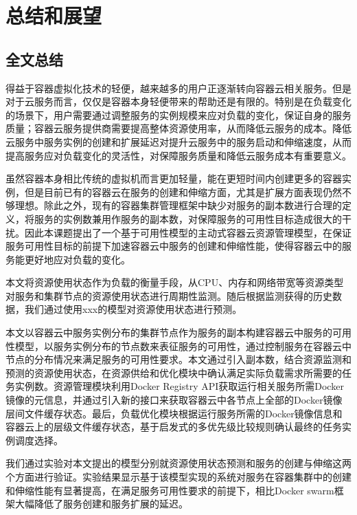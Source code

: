 \chapter{总结和展望}\label{chap:summary}
\section{全文总结}
得益于容器虚拟化技术的轻便，越来越多的用户正逐渐转向容器云相关服务。但是对于云服务而言，仅仅是容器本身轻便带来的帮助还是有限的。特别是在负载变化的场景下，用户需要通过调整服务的实例规模来应对负载的变化，保证自身的服务质量；容器云服务提供商需要提高整体资源使用率，从而降低云服务的成本。降低云服务中服务实例的创建和扩展延迟对提升云服务中的服务启动和伸缩速度，从而提高服务应对负载变化的灵活性，对保障服务质量和降低云服务成本有重要意义。

虽然容器本身相比传统的虚拟机而言更加轻量，能在更短时间内创建更多的容器实例，但是目前已有的容器云在服务的创建和伸缩方面，尤其是扩展方面表现仍然不够理想。除此之外，现有的容器集群管理框架中缺少对服务的副本数进行合理的定义，将服务的实例数兼用作服务的副本数，对保障服务的可用性目标造成很大的干扰。因此本课题提出了一个基于可用性模型的主动式容器云资源管理模型，在保证服务可用性目标的前提下加速容器云中服务的创建和伸缩性能，使得容器云中的服务能更好地应对负载的变化。

本文将资源使用状态作为负载的衡量手段，从CPU、内存和网络带宽等资源类型对服务和集群节点的资源使用状态进行周期性监测。随后根据监测获得的历史数据，我们通过使用xxx的模型对资源使用状态进行预测。

本文以容器云中服务实例分布的集群节点作为服务的副本构建容器云中服务的可用性模型，以服务实例分布的节点数来表征服务的可用性，通过控制服务在容器云中节点的分布情况来满足服务的可用性要求。本文通过引入副本数，结合资源监测和预测的资源使用状态，在资源供给和优化模块中确认满足实际负载需求所需要的任务实例数。资源管理模块利用Docker Registry API获取运行相关服务所需Docker镜像的元信息，并通过引入新的接口来获取容器云中各节点上全部的Docker镜像层间文件缓存状态。最后，负载优化模块根据运行服务所需的Docker镜像信息和容器云上的层级文件缓存状态，基于启发式的多优先级比较规则确认最终的任务实例调度选择。

我们通过实验对本文提出的模型分别就资源使用状态预测和服务的创建与伸缩这两个方面进行验证。实验结果显示基于该模型实现的系统对服务在容器集群中的创建和伸缩性能有显著提高，在满足服务可用性要求的前提下，相比Docker swarm框架大幅降低了服务创建和服务扩展的延迟。


